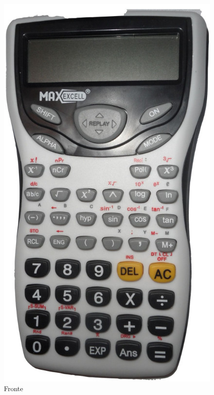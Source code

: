 \begin{figure}
	\centering%
	\includegraphics{maxexcell/SAM_3732_2.jpg}%
		\caption{Fronte}\label{fig:Maxcexcellfront}
\end{figure}
